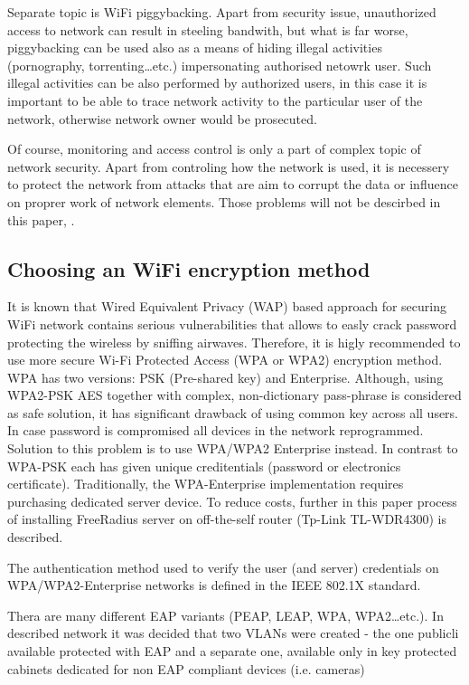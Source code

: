 \documentclass{llncs}
\begin{document}
Separate topic is WiFi piggybacking. Apart from security issue,
unauthorized access to network can result in steeling bandwith, but what is far
worse, piggybacking can be used also as a means of hiding illegal activities
(pornography, torrenting\ldots etc.) impersonating authorised netowrk user. Such
illegal activities can be also performed by authorized users, in this case it is
important to be able to trace network activity to the particular user of the
network, otherwise network owner would be prosecuted. 

Of course, monitoring and access control is only a part of complex topic of
network security. Apart from controling how the network is used, it is
necessery to protect the network from attacks that are aim to corrupt the data
or influence on proprer work of network elements. Those problems will not be
descirbed in this paper, .

\subsection{Choosing an WiFi encryption method}
It is known that Wired Equivalent Privacy (WAP) based approach for
securing WiFi network contains serious vulnerabilities that allows to
easly crack password protecting the wireless by sniffing airwaves.
Therefore, it is higly recommended to use more secure Wi-Fi Protected Access
(WPA or WPA2) encryption method. WPA has two versions: PSK
(Pre-shared key) and Enterprise. Although, using WPA2-PSK AES together
with complex, non-dictionary pass-phrase is considered as safe solution, it has
significant drawback of using common key across all users.
In case password is compromised all devices in the
network reprogrammed. Solution to this problem is to use WPA/WPA2 Enterprise
instead. In contrast to WPA-PSK each has given unique creditentials
(password or electronics certificate). Traditionally, the WPA-Enterprise
implementation requires purchasing dedicated server device. To reduce
costs, further in this paper process of installing FreeRadius server on
off-the-self router (Tp-Link TL-WDR4300) is described.


The authentication method used to verify the user (and server) credentials on
WPA/WPA2-Enterprise networks is defined in the IEEE 802.1X standard.

Thera are many different EAP variants (PEAP, LEAP, WPA, WPA2\ldots etc.). In
described network it was decided that two VLANs were created - the one
publicli available protected with EAP and a separate one, available only in
key protected cabinets dedicated for non EAP compliant devices (i.e. cameras)
 
\end{document}

